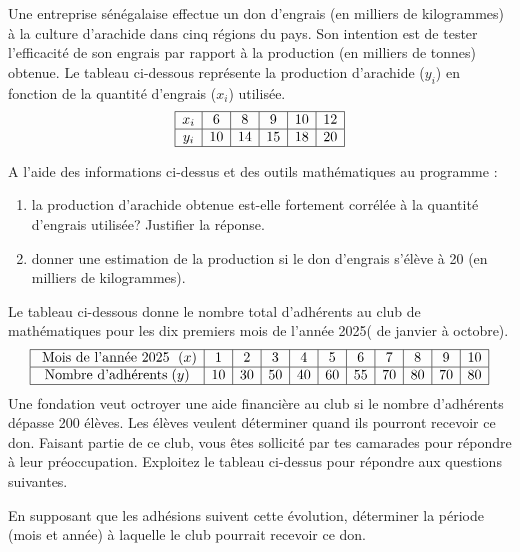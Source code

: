 \begin{exercice}
Une entreprise sénégalaise effectue un don d'engrais (en milliers de kilogrammes) à la culture d'arachide dans cinq
régions du pays. Son intention est de tester l'efficacité de son engrais par rapport à la production (en milliers de
tonnes) obtenue. Le tableau ci-dessous représente la production d'arachide ($y_i $) en fonction de la quantité
d'engrais ($x_i $) utilisée.
$$
 \begin{array}{|c|c|c|c|c|c|}
 \hline
 x_i  &6&8&9&10&12\\ \hline
 y_i    &10&14&15&18&20\\\hline
  \end{array}
 $$
 
 \medskip
A l'aide des informations ci-dessus et des outils mathématiques au programme :

\begin{enumerate}
\item la production d'arachide obtenue est-elle fortement corrélée à la quantité d'engrais utilisée? Justifier la
réponse.
\item donner une estimation de la production si le don d'engrais s'élève à 20 (en milliers de kilogrammes).
\end{enumerate}

\end{exercice}

\begin{exercice}
Le tableau ci-dessous donne le nombre total d'adhérents au club de mathématiques pour les dix premiers mois de l'année 2025( de janvier à octobre).
$$
\begin{array}{|c|c|c|c|c|c|c|c|c|c|c|}
\hline
\text{ Mois de l'année 2025 }\;  (x)  &1 & 2 &  3 &  4 & 5 & 6 & 7 &  8&9&10    \\
\hline
\text{Nombre d'adhérents}\;   (y)  & 10 & 30 & 50 & 40 & 60 &  55 & 70 & 80 & 70&80 \\
\hline
\end{array}
$$
Une fondation veut octroyer une aide financière au club si le nombre d'adhérents dépasse 200 élèves. Les élèves veulent déterminer quand ils pourront recevoir ce don.
Faisant partie de ce club, vous êtes sollicité par tes camarades pour  répondre à leur préoccupation.
Exploitez le tableau ci-dessus pour répondre aux questions suivantes.

\medskip
 En supposant que les adhésions suivent cette évolution, déterminer   la période (mois et année) à laquelle le club pourrait recevoir ce don.
  
\end{exercice}


